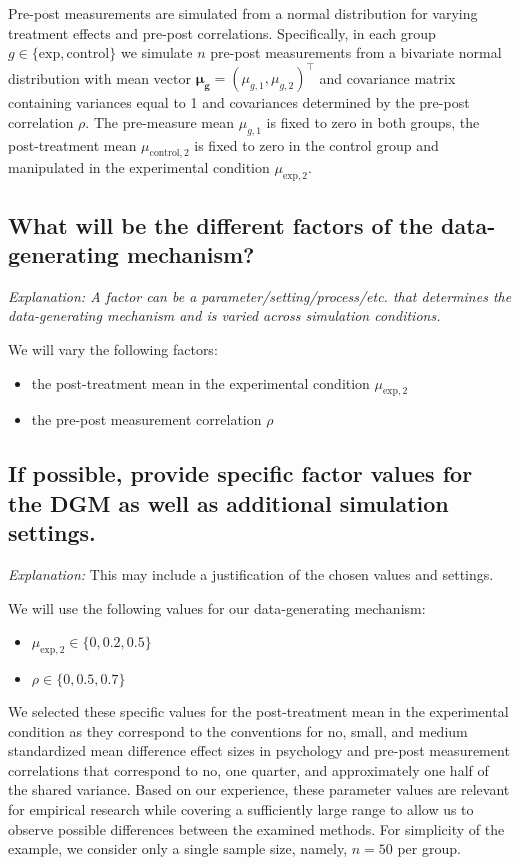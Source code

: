 \documentclass[12pt]{article}
\begin{document}
\begin{examplebox}
Pre-post measurements are simulated from a normal distribution for varying treatment effects and pre-post correlations. Specifically, in each group $g \in \{\text{exp}, \text{control}\}$ we simulate $n$ pre-post measurements from a bivariate normal distribution with mean vector $\boldsymbol{\mu_g} = (\mu_{g,1}, \mu_{g,2})^\top$ and covariance matrix containing variances equal to 1 and covariances determined by the pre-post correlation $\rho$. The pre-measure mean ${\mu_{g,1}}$ is fixed to zero in both groups, the post-treatment mean ${\mu_{\text{control},2}}$ is fixed to zero in the control group and manipulated in the experimental condition ${\mu_{\text{exp},2}}$.
\end{examplebox}

\subsection{What will be the different factors of the data-generating mechanism?} 
\textit{Explanation: A factor can be a parameter/setting/process/etc. that determines the data-generating mechanism and is varied across simulation conditions.} 
\begin{examplebox}
We will vary the following factors:
\begin{itemize}
    \item the post-treatment mean in the experimental condition ${\mu_{\text{exp},2}}$
    \item the pre-post measurement correlation $\rho$
\end{itemize}
\end{examplebox}
    
\subsection{If possible, provide specific factor values for the DGM as well as additional simulation settings.} 
\textit{Explanation:} This may include a justification of the chosen values and settings.
    
\begin{examplebox}
We will use the following values for our data-generating mechanism:
\begin{itemize}
        \item ${\mu_{\text{exp},2}} \in \{0, 0.2, 0.5\}$
        \item $\rho \in \{0, 0.5, 0.7\}$
\end{itemize}
We selected these specific values for the post-treatment mean in the experimental condition as they correspond to the conventions for no, small, and medium standardized mean difference effect sizes in psychology \parencite{Cohen1988} and pre-post measurement correlations that correspond to no, one quarter, and approximately one half of the shared variance. Based on our experience, these parameter values are relevant for empirical research while covering a sufficiently large range to allow us to observe possible differences between the examined methods. For simplicity of the example, we consider only a single sample size, namely, $n = 50$ per group.
\end{examplebox}
\end{document}
